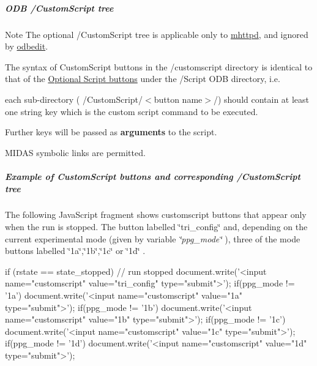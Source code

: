 \label{RC_mhttpd_custom_features_idx_ODB_tree_customscript}
\hypertarget{RC_mhttpd_custom_features_idx_ODB_tree_customscript}{}
 \hypertarget{RC_mhttpd_custom_features_RC_odb_customscript_tree}{}\subparagraph{ODB /CustomScript tree}\label{RC_mhttpd_custom_features_RC_odb_customscript_tree}
\begin{DoxyNote}{Note}
The optional /CustomScript tree is applicable only to \hyperlink{RC_mhttpd}{mhttpd}, and ignored by \hyperlink{RC_odbedit}{odbedit}.
\end{DoxyNote}
The syntax of CustomScript buttons in the  /customscript  directory is identical to that of the \hyperlink{RC_mhttpd_status_page_features_RC_mhttpd_status_script_buttons}{Optional Script buttons} under the /Script ODB directory, i.e.


\begin{DoxyItemize}
\item each sub-\/directory ( /CustomScript/$<$button name$>$/) should contain at least one string key which is the custom script command to be executed.
\item Further keys will be passed as {\bfseries  arguments } to the script.
\item MIDAS symbolic links are permitted.
\end{DoxyItemize}

\par
 \hypertarget{RC_mhttpd_custom_features_RC_mhttpd_customscript_example}{}\subparagraph{Example of CustomScript buttons and corresponding /CustomScript tree}\label{RC_mhttpd_custom_features_RC_mhttpd_customscript_example}
The following JavaScript fragment shows customscript buttons that appear only when the run is stopped. The button labelled \char`\"{}tri\_\-config\char`\"{} and, depending on the current experimental mode (given by variable {\itshape  \char`\"{}ppg\_\-mode\char`\"{} \/}), three of the mode buttons labelled \char`\"{}1a\char`\"{},\char`\"{}1b\char`\"{},\char`\"{}1c\char`\"{} or \char`\"{}1d\char`\"{} . 
\begin{DoxyCode}
 if (rstate == state_stopped) // run stopped
{
 document.write('<input name="customscript" value="tri_config" type="submit">');
if(ppg_mode != '1a')
  document.write('<input name="customscript" value="1a" type="submit">');
if(ppg_mode != '1b')
  document.write('<input name="customscript" value="1b" type="submit">');
if(ppg_mode != '1c')
 document.write('<input name="customscript" value="1c" type="submit">');
if(ppg_mode != '1d')
 document.write('<input name="customscript" value="1d" type="submit">');
}
\end{DoxyCode}


